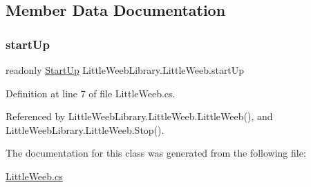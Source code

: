 \subsection{Member Data Documentation}
\mbox{\label{class_little_weeb_library_1_1_little_weeb_ad4c016487a2b4f445d12bd8dc0414675}} 
\subsubsection{\texorpdfstring{start\+Up}{startUp}}
{\footnotesize\ttfamily readonly \mbox{\hyperlink{class_little_weeb_library_1_1_start_up}{Start\+Up}} Little\+Weeb\+Library.\+Little\+Weeb.\+start\+Up\hspace{0.3cm}{\ttfamily [private]}}



Definition at line 7 of file Little\+Weeb.\+cs.



Referenced by Little\+Weeb\+Library.\+Little\+Weeb.\+Little\+Weeb(), and Little\+Weeb\+Library.\+Little\+Weeb.\+Stop().



The documentation for this class was generated from the following file\+:\begin{DoxyCompactItemize}
\item 
\mbox{\hyperlink{_little_weeb_8cs}{Little\+Weeb.\+cs}}\end{DoxyCompactItemize}
